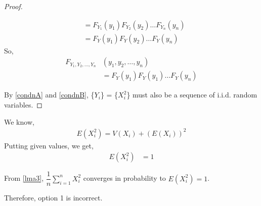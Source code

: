 \documentclass[journal,12pt,twocolumn]{IEEEtran}
\begin{document}
\begin{enumerate}
\begin{proof}
\begin{enumerate}
\begin{align}
    &=F_{Y_1}(y_1) F_{Y_2}(y_2)\dots F_{Y_n}(y_n)\\
    &=F_Y(y_1) F_Y(y_2) \dots F_Y(y_n)
\end{align}
So,
\begin{align} \label{condnB}
    F_{Y_1,Y_2,\dots,Y_n}&(y_1,y_2,\dots,y_n)\nonumber \\
    &=F_Y(y_1)F_Y(y_1)\dots F_Y(y_n)
\end{align}
\end{enumerate}
By \eqref{condnA} and \eqref{condnB}, \{$Y_i$\} = \{$X_i^2$\} must also be a sequence of i.i.d. random variables.
\end{proof}

We know,
\begin{align}
    E(X_i^2)=V(X_i)+(E(X_i))^2
\end{align}
Putting given values, we get,
\begin{align} 
    E(X_i^2)&=1 \label{muval}
\end{align}

From \ref{lma3},  
\begin{math}\dfrac{1}{n}\sum_{i=1}^n X_i^2\end{math} converges in probability to $E(X_i^2)=1$.

Therefore, option 1 is incorrect.


\end{enumerate}
\end{document}
